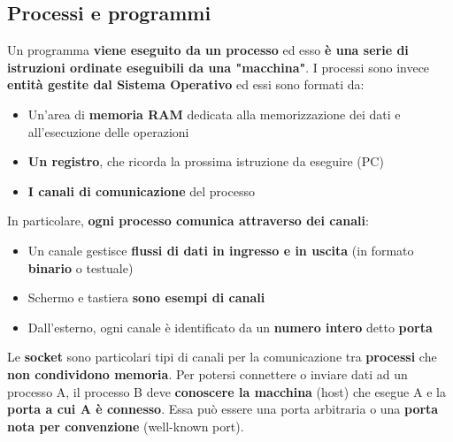 \documentclass[12pt]{article}
\begin{document}
\subsection{Processi e programmi}
Un programma \textbf{viene eseguito da un processo} ed esso \textbf{è una serie di istruzioni ordinate eseguibili da una "macchina"}. I processi sono invece \textbf{entità gestite dal Sistema Operativo} ed essi sono formati da:
\begin{itemize}
    \item Un'area di \textbf{memoria RAM} dedicata alla memorizzazione dei dati e all'esecuzione delle operazioni
    \item \textbf{Un registro}, che ricorda la prossima istruzione da eseguire (PC)
    \item \textbf{I canali di comunicazione} del processo
\end{itemize}
In particolare, \textbf{ogni processo comunica attraverso dei canali}:
\begin{itemize}
    \item Un canale gestisce \textbf{flussi di dati in ingresso e in uscita} (in formato \textbf{binario} o testuale)
    \item Schermo e tastiera \textbf{sono esempi di canali}
    \item Dall'esterno, ogni canale è identificato da un \textbf{numero intero} detto \textbf{porta}
\end{itemize}
Le \textbf{socket} sono particolari tipi di canali per la comunicazione tra \textbf{processi} che \textbf{non condividono memoria}. Per potersi connettere o inviare dati ad un processo A, il processo B deve \textbf{conoscere la macchina} (host) che esegue A e la \textbf{porta a cui A è connesso}. Essa può essere una porta arbitraria o una \textbf{porta nota per convenzione} (well-known port).
\end{document}
